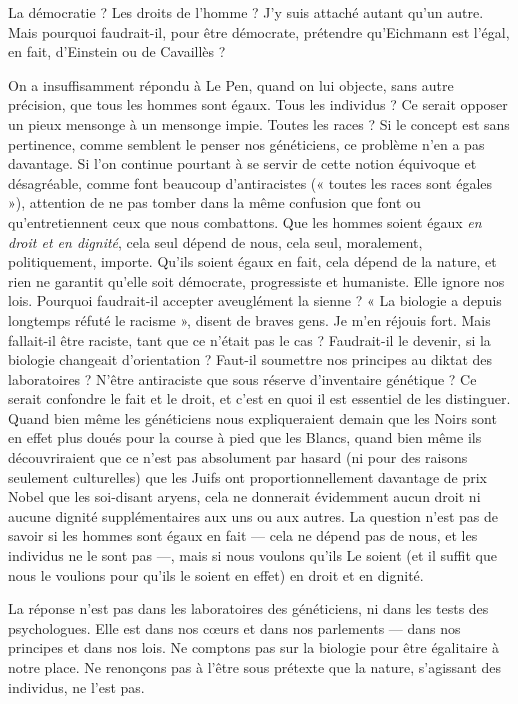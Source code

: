 La démocratie ? Les droits de l’homme ? J'y suis attaché autant qu’un autre.
Mais pourquoi faudrait-il, pour être démocrate, prétendre qu’Eichmann est
l’égal, en fait, d’Einstein ou de Cavaillès ?

On a insuffisamment répondu à Le Pen, quand on lui objecte, sans autre
précision, que tous les hommes sont égaux. Tous les individus ? Ce serait
opposer un pieux mensonge à un mensonge impie. Toutes les races ? Si le
concept est sans pertinence, comme semblent le penser nos généticiens, ce problème
n’en a pas davantage. Si l’on continue pourtant à se servir de cette
notion équivoque et désagréable, comme font beaucoup d’antiracistes (« toutes
les races sont égales »), attention de ne pas tomber dans la même confusion que
font ou qu’entretiennent ceux que nous combattons. Que les hommes soient
égaux {\it en droit et en dignité}, cela seul dépend de nous, cela seul, moralement,
politiquement, importe. Qu'ils soient égaux en fait, cela dépend de la nature, et
rien ne garantit qu’elle soit démocrate, progressiste et humaniste. Elle ignore
nos lois. Pourquoi faudrait-il accepter aveuglément la sienne ? « La biologie a
depuis longtemps réfuté le racisme », disent de braves gens. Je m’en réjouis fort.
Mais fallait-il être raciste, tant que ce n’était pas le cas ? Faudrait-il le devenir, si
la biologie changeait d’orientation ? Faut-il soumettre nos principes au diktat des
laboratoires ? N’être antiraciste que sous réserve d’inventaire génétique ? Ce serait
confondre le fait et le droit, et c’est en quoi il est essentiel de les distinguer.
Quand bien même les généticiens nous expliqueraient demain que les Noirs sont
en effet plus doués pour la course à pied que les Blancs, quand bien même ils
découvriraient que ce n’est pas absolument par hasard (ni pour des raisons seulement
culturelles) que les Juifs ont proportionnellement davantage de prix Nobel
que les soi-disant aryens, cela ne donnerait évidemment aucun droit ni aucune
dignité supplémentaires aux uns ou aux autres. La question n’est pas de savoir si
les hommes sont égaux en fait — cela ne dépend pas de nous, et les individus ne
le sont pas —, mais si nous voulons qu’ils Le soient (et il suffit que nous le voulions
pour qu’ils le soient en effet) en droit et en dignité.

La réponse n’est pas dans les laboratoires des généticiens, ni dans les tests
des psychologues. Elle est dans nos cœurs et dans nos parlements — dans nos
principes et dans nos lois. Ne comptons pas sur la biologie pour être égalitaire
à notre place. Ne renonçons pas à l’être sous prétexte que la nature, s'agissant
des individus, ne l’est pas.

